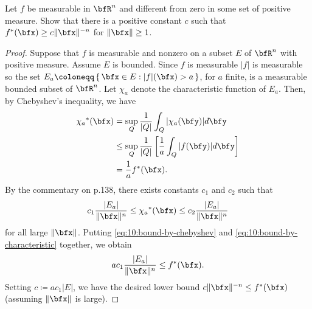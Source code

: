 
\begin{problem}
Let $f$ be measurable in $\bfR^n$ and different from zero in some set of
positive measure. Show that there is a positive constant $c$ such that
$f^*(\bfx)\geq c\|\bfx\|^{-n}$ for $\|\bfx\|\geq 1$.
\end{problem}
\begin{proof}
Suppose that $f$ is measurable and nonzero on a subset $E$ of $\bfR^n$ with
positive measure. Assume $E$ is bounded. Since $f$ is measurable $|f|$ is
measurable so the set $E_a\coloneqq \left\{\,\bfx\in
  E:|f|(\bfx)>a\,\right\}$, for $a$ finite, is a measurable bounded subset
of $\bfR^n$. Let $\chi_a$ denote the characteristic function of
$E_a$. Then, by Chebyshev's inequality, we have
\begin{equation}
\label{eq:10:bound-by-chebyshev}
\begin{aligned}
{\chi_a}^*(\bfx)
&=\sup_Q\frac{1}{|Q|}\int_Q|\chi_a(\bfy)|d\bfy\\
&\leq\sup_Q\frac{1}{|Q|}\left[\frac{1}{a}\int_Q|f(\bfy)|d\bfy\right]\\
&=\frac{1}{a}f^*(\bfx).
\end{aligned}
\end{equation}
By the commentary on p.\@ 138, there exists constants $c_1$ and $c_2$ such
that
\begin{equation}
\label{eq:10:bound-by-characteristic}
c_1\frac{|E_a|}{\|\bfx\|^n}\leq{\chi_a}^*(\bfx)\leq c_2\frac{|E_a|}{\|\bfx\|^n}
\end{equation}
for all large $\|\bfx\|$. Putting \eqref{eq:10:bound-by-chebyshev} and
\eqref{eq:10:bound-by-characteristic} together, we obtain
\begin{equation}
  \label{eq:lower-bound-maximal-fun}
ac_1\frac{|E_a|}{\|\bfx\|^n}\leq f^*(\bfx).
\end{equation}
Setting $c\coloneqq ac_1|E|$, we have the desired lower bound
$c\|\bfx\|^{-n}\leq f^*(\bfx)$ (assuming $\|\bfx\|$ is large).
\end{proof}
\newpage

